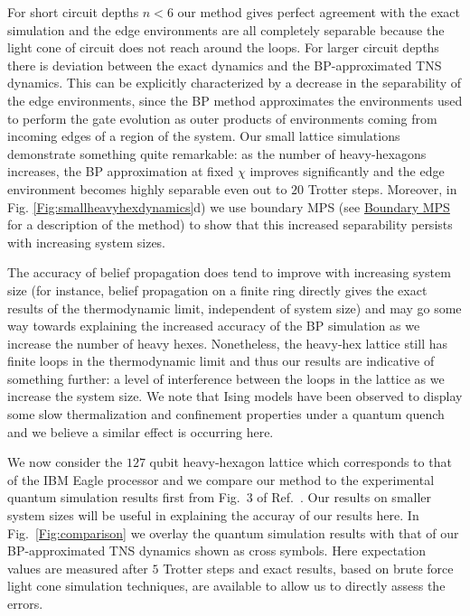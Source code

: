 \documentclass[%
 superscriptaddress,
 amsmath,amssymb,
 prx, nofootinbib,
 twocolumn
]{revtex4-2}
\begin{document}
For short circuit depths $n < 6$ our method gives perfect agreement with the exact simulation and the edge environments are all completely separable because the light cone of circuit does not reach around the loops. For larger circuit depths there is deviation between the exact dynamics and the  BP-approximated TNS dynamics. This can be explicitly characterized by a decrease in the separability of the edge environments, since the BP method approximates the environments used to perform the gate evolution as outer products of environments coming from incoming edges of a region of the system. Our small lattice simulations demonstrate something quite remarkable: as the number of heavy-hexagons increases, the BP approximation at fixed $\chi$ improves significantly and the edge environment becomes highly separable even out to $20$ Trotter steps. Moreover, in Fig. \ref{Fig:smallheavyhexdynamics}d) we use boundary MPS (see \hyperref[Subsec:BoundaryMPS]{Boundary MPS} for a description of the method) to show that this increased separability persists with increasing system sizes.
\par The accuracy of belief propagation does tend to improve with increasing system size (for instance, belief propagation on a finite ring directly gives the exact results of the thermodynamic limit, independent of system size) and may go some way towards explaining the increased accuracy of the BP simulation as we increase the number of heavy hexes. Nonetheless, the heavy-hex lattice still has finite loops in the thermodynamic limit and thus our results are indicative of something further: a level of interference between the loops in the lattice as we increase the system size. We note that Ising models have been observed to display some slow thermalization and confinement properties under a quantum quench \cite{Birnkammer2022, Marton2017} and we believe a similar effect is occurring here.
\par We now consider the $127$ qubit heavy-hexagon lattice which corresponds to that of the IBM Eagle processor and we compare our method to the experimental quantum simulation results first from Fig.~3 of Ref.~\cite{kim2023}. Our results on smaller system sizes will be useful in explaining the accuray of our results here. In Fig.~\ref{Fig:comparison} we overlay the quantum simulation results with that
of our BP-approximated TNS dynamics shown as cross symbols.
Here expectation values are measured after $5$ Trotter steps and exact results, based on brute force light cone simulation techniques, are available to allow us to directly assess the errors. 
\end{document}
